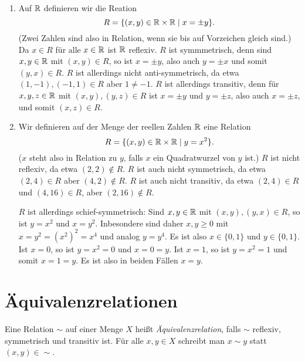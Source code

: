 \begin{bsp}
\begin{enumerate}[leftmargin=*]
  \item
   Auf $\mathbb{R}$ definieren wir die Reation
   \[
    R
    = \{(x,y) \in \mathbb{R} \times \mathbb{R} \mid x = \pm y\}.
   \]
   (Zwei Zahlen sind also in Relation, wenn sie bis auf Vorzeichen gleich sind.) Da $x \in R$ für alle $x \in \mathbb{R}$ ist $\mathbb{R}$ reflexiv. $R$ ist symmmetrisch, denn sind $x,y \in \mathbb{R}$ mit $(x,y) \in R$, so ist $x = \pm y$, also auch $y = \pm x$ und somit $(y,x) \in R$. $R$ ist allerdings nicht anti-symmetrisch, da etwa $(1,-1), (-1,1) \in R$ aber $1 \neq -1$. $R$ ist allerdings transitiv, denn für $x,y,z \in \mathbb{R}$ mit $(x,y), (y,z) \in R$ ist $x = \pm y$ und $y = \pm z$, also auch $x = \pm z$, und somit $(x,z) \in R$.
   
  \item
   Wir definieren auf der Menge der reellen Zahlen $\mathbb{R}$ eine Relation
   \[
    R = \{(x,y) \in \mathbb{R} \times \mathbb{R} \mid y = x^2\}.
   \]
   ($x$ steht also in Relation zu $y$, falls $x$ ein Quadratwurzel von $y$ ist.) $R$ ist nicht reflexiv, da etwa $(2,2) \notin R$. $R$ ist auch nicht symmetrisch, da etwa $(2,4) \in R$ aber $(4,2) \notin R$. $R$ ist auch nicht transitiv, da etwa $(2,4) \in R$ und $(4,16) \in R$, aber $(2,16) \notin R$.
   
   $R$ ist allerdings schief-symmetrisch: Sind $x, y \in \mathbb{R}$ mit $(x,y), (y,x) \in R$, so ist $y = x^2$ und $x = y^2$. Inbesondere sind daher $x,y \geq 0$ mit $x = y^2 = (x^2)^2 = x^4$ und analog $y = y^4$. Es ist also $x \in \{0,1\}$ und $y \in \{0,1\}$. Ist $x = 0$, so ist $y = x^2 = 0$ und $x = 0 = y$. Ist $x = 1$, so ist $y = x^2 = 1$ und somit $x = 1 = y$. Es ist also in beiden Fällen $x = y$.
 \end{enumerate}
\end{bsp}





\section{Äquivalenzrelationen}
\begin{defi}
 Eine Relation $\sim$ auf einer Menge $X$ heißt \emph{Äquivalenzrelation}, falls $\sim$ reflexiv, symmetrisch und transitiv ist. Für alle $x,y \in X$ schreibt man $x \sim y$ statt $(x,y) \in \sim$.
\end{defi}

